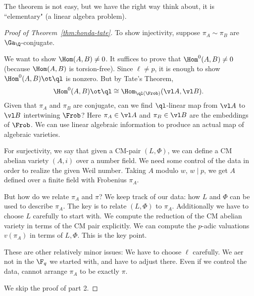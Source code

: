 The theorem is not easy, but we have the right way think about, it is ``elementary" (a linear algebra problem).
\begin{proof}[Proof of Theorem~\ref{thm:honda-tate}]
To show injectivity, suppose $\pi_A\sim \pi_B$ are $\Ga_{\Q}$-conjugate.

We want to show $\Hom(A,B)\ne 0$. 
It suffices to prove that $\Hom^0(A,B)\ne 0$ (because $\Hom(A,B)$ is torsion-free). Since $\ell\ne p$, it is enough to show $\Hom^0(A,B)\ot \ql$ is nonzero. But by Tate's Theorem,
\[
\Hom^0(A,B)\ot \ql\cong \Hom_{\ql(\Frob)}(\vl A, \vl B).
\]
Given that $\pi_A$ and $\pi_B$ are conjugate, can we find $\ql$-linear map from $\vl A$ to $\vl B$ intertwining $\Frob$? %
Here $\pi_A\in \vl A$ and $\pi_B\in \vl B$ are the embeddings of $\Frob$. 
We can use linear algebraic information to produce an actual map of algebraic varieties. %



For surjectivity, we say that given a CM-pair $(L,\Phi)$, we can define a CM abelian variety $(A,i)$ over a number field. %
We need some control of the data in order to realize the given Weil number. Taking $A$ modulo $w$, $w\mid p$, we get $A$ defined over a finite field with Frobenius $\pi_A$.

But how do we relate $\pi_A$ and $\pi$? We keep track of our data: how $L$ and $\Phi$ can be used to describe $\pi_A$. The key is to relate $(L,\Phi)$ to $\pi_A$. Additionally we have to choose $L$ carefully to start with. We compute the reduction of the CM abelian variety in terms of the CM pair explicitly. We can compute the $p$-adic valuations $v(\pi_A)$ in terms of $L,\Phi$. This is the key point.

These are other relatively minor issues: 
We have to choose $\ell$ carefully. We aer not in the $\F_q$ we started with, and have to adjust there. Even if we control the data, cannot arrange $\pi_A$ to be exactly $\pi$. 

We skip the proof of part 2.
\end{proof}
